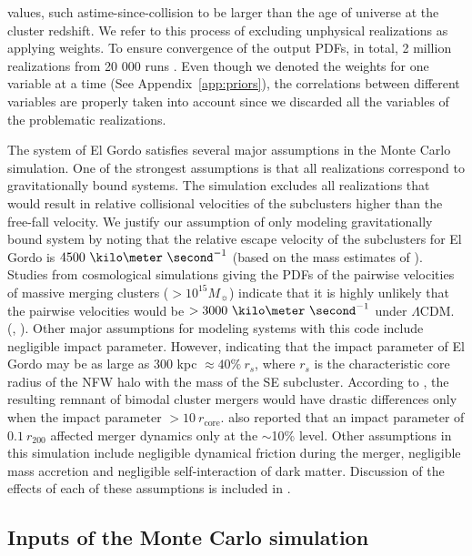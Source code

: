 values, such astime-since-collision to be larger than the age of universe at the
cluster redshift.  We refer to this process of excluding unphysical
realizations as applying weights. 
To ensure convergence of the output PDFs, in total, 2 million realizations
from 20 000 runs . 
Even though we denoted the weights for one variable at a time (See Appendix~\ref{app:priors}), 
the correlations between different variables are properly taken into account
since we discarded all the variables of the problematic
realizations.\par 
The system of El Gordo satisfies several major assumptions in the Monte Carlo
simulation. One of the strongest assumptions is that all realizations correspond to
gravitationally bound systems. The simulation excludes all realizations
that would result in relative collisional velocities of the subclusters
higher than the free-fall velocity. We justify our assumption of only
modeling gravitationally bound system by noting that the relative escape
velocity of the subclusters for El Gordo is
$4500~\kilo\meter~\second^{-1}$ (based on the mass estimates of
\cite{Jee13}). Studies from cosmological simulations giving the PDFs of the pairwise velocities of massive merging clusters ($>
10^{15} M_{\sun}$) indicate that it is highly unlikely that the pairwise
velocities would be $> 3000~\kilo \meter~\second^{-1}$ under $\Lambda$CDM.
(\citealt{Thompson12}, \citealt{Lee2010}).  Other major assumptions for
modeling systems with this code include negligible impact parameter.
However, \citealt{Molnar14} indicating that the impact parameter of El Gordo
may be as large as $300$ kpc $ \approx 40\%~r_s$,
where $r_s$ is the characteristic core
radius of the NFW halo with the mass of the SE subcluster. According to
\cite{Ricker98}, the resulting remnant of bimodal cluster mergers would
have drastic differences only when the impact parameter $> 10~ r_{\text{core}}$.
\cite{Mastropietro2008a} also reported that an impact parameter of $0.1~
r_{200}$ affected merger dynamics only at the $\sim$10\% level.   
Other assumptions in this simulation include negligible dynamical friction
during the merger, negligible mass accretion and negligible self-interaction
of dark matter. Discussion of the effects of each of these assumptions is
included in .  
\par
\subsection{Inputs of the Monte Carlo simulation} \label{sec: inputs}
\setcounter{table}{0} 

